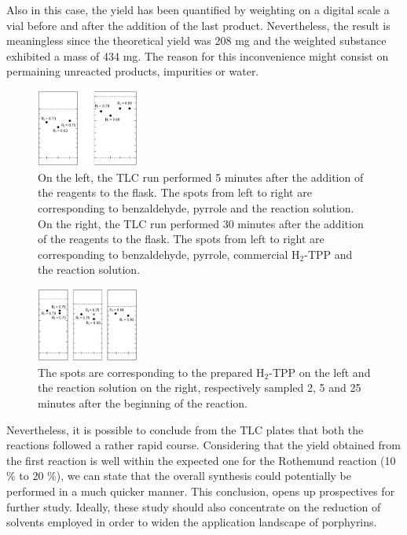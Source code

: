 \documentclass[twoside,twocolumn,9pt]{article}
\begin{document}
Also in this case, the yield has been quantified by weighting on a digital scale a vial before and after the addition of the last product.
Nevertheless, the result is meaningless since the theoretical yield was 208 mg and the weighted substance exhibited a mass of 434 mg.
The reason for this inconvenience might consist on permaining unreacted products, impurities or water.
\begin{figure}
	\includegraphics[width=0.3\textwidth]{TLC-h2-TPP}
	\caption{On the left, the TLC run performed 5 minutes after the addition of the reagents to the flask. The spots from left to right are corresponding to benzaldehyde, pyrrole and the reaction solution. On the right, the TLC run performed 30 minutes after the addition of the reagents to the flask. The spots from left to right are corresponding to benzaldehyde, pyrrole, commercial H$_{2}$-TPP and the reaction solution.}
	\label{tlc-h2tpp}
\end{figure}
\begin{figure}
	\includegraphics[width=0.3\textwidth]{TLC-Zn-TPP}
	\caption{The spots are corresponding to the prepared H$_{2}$-TPP on the left and the reaction solution on the right, respectively sampled 2, 5 and 25 minutes after the beginning of the reaction.}
	\label{TLC-Zn-TPP}
\end{figure}
Nevertheless, it is possible to conclude from the TLC plates that both the reactions followed a rather rapid course.
Considering that the yield obtained from the first reaction is well within the expected one for the Rothemund reaction (10 \% to 20 \%), we can state that the overall synthesis could potentially be performed in a much quicker manner.
This conclusion, opens up prospectives for further study.
Ideally, these study should also concentrate on the reduction of solvents employed in order to widen the application landscape of porphyrins.
\end{document}
